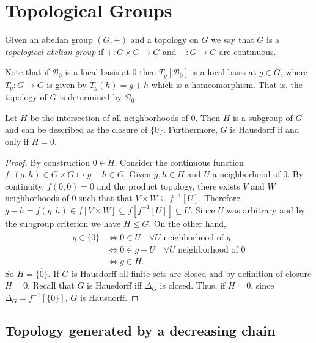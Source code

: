 \section{Topological Groups}
\begin{defi}
    Given an abelian group $(G,+)$ and a topology on $G$ we say that $G$ is a \emph{topological abelian group} if $+\colon G\times G\to G$ and $-\colon G\to G$ are continuous.
\end{defi}
Note that if $\mathcal B_0$ is a local basis at 0 then $T_g[\mathcal B_0]$ is a local basis at $g\in G$, where $T_g\colon G\to G$ is given by $T_g(h)=g+h$ which is a homeomorphism. That is, the topology of $G$ is determined by $\mathcal B_0$.

\begin{thm}\label{thm1}
Let $H$ be the intersection of all neighborhoods of $0$. Then $H$ is a subgroup of $G$ and can be described as the closure of $\{0\}$. Furthermore, $G$ is Hausdorff if and only if $H=0$.    
\end{thm}
\begin{proof}
    By construction $0\in H$. Consider the continuous function $f\colon (g,h)\in G\times G\mapsto g-h\in G$. Given $g,h\in H$ and $U$ a neighborhood of $0$. By continuity, $f(0,0)=0$ and the product topology, there exists $V$ and $W$ neighborhoods of $0$ such that that $V\times W\subseteq f^{-1}[U]$. Therefore $g-h=f(g,h)\in f[V\times W]\subseteq f[f^{-1}[U]]\subseteq U$. Since $U$ was arbitrary and by the subgroup criterion we have $H\leq G$. On the other hand,
    \begin{align*}
             g\in\overline{\{0\}} &\iff 0\in U \quad \forall U\text{ neighborhood of }g \\
             &\iff 0\in g+U \quad \forall U\text{ neighborhood of }0 \\
             &\iff g\in H.
    \end{align*}
    So $H=\overline{\{0\}}$. If $G$ is Hausdorff all finite sets are closed and by definition of closure $H=0$. Recall that $G$ is Hausdorff iff $\Delta_G$ is closed. Thus, if $H=0$, since $\Delta_G=f^{-1}[\{0\}]$, $G$ is Hausdorff.
\end{proof}

\subsection{Topology generated by a decreasing chain}

